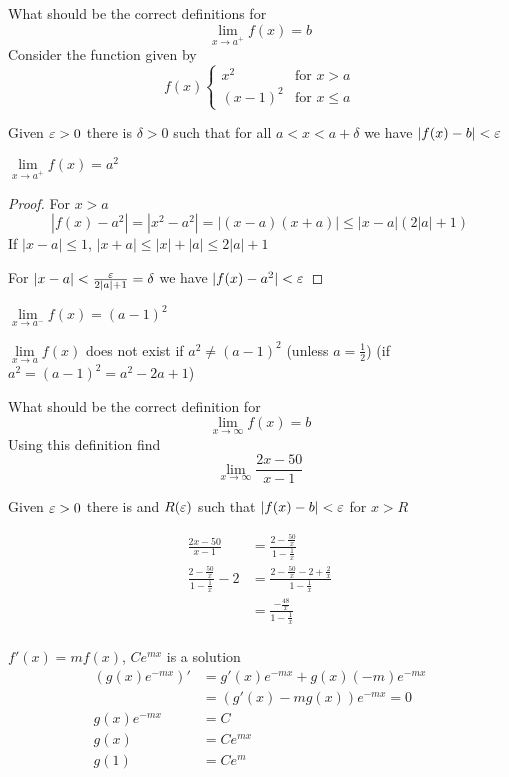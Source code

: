 \begin{question}{6}
  What should be the correct definitions for
  \[\lim\limits_{x \to a^+} f(x) = b\]
  Consider the function given by
  \[f(x)\begin{cases}
    x^2 & \text{for } x > a\\
    (x-1)^2 & \text{for } x \le a
  \end{cases}\]
\end{question}

Given $\varepsilon > 0$ there is $\delta > 0$ such that for all $a < x < a + \delta$ we have $|f(x) - b| < \varepsilon$

$\lim\limits_{x \to a^+} f(x) = a^2$
\begin{proof}
  For $x > a$
  \[|f(x) - a^2| = |x^2 - a^2| = |(x-a)(x+a)| \le |x-a| (2|a| + 1)\]
  If $|x - a| \le 1$, $|x + a| \le |x| + |a| \le 2|a| + 1$

  For $|x-a| < \frac{\varepsilon}{2|a| + 1} = \delta$ we have $|f(x) - a^2| < \varepsilon$
\end{proof}

$\lim\limits_{x \to a^-} f(x) = (a-1)^2$

$\lim\limits_{x \to a} f(x)$ does not exist if $a^2 \neq (a-1)^2$ (unless $a = \frac{1}{2}$)
(if $a^2 = (a-1)^2 = a^2 - 2a + 1$)

\begin{question}{7}
  What should be the correct definition for
  \[\lim\limits_{x \to \infty} f(x) = b\]
  Using this definition find
  \[\lim\limits_{x \to \infty} \frac{2x - 50}{x - 1}\] 
\end{question}

Given $\varepsilon > 0$ there is and $R(\varepsilon)$ such that $|f(x) - b| < \varepsilon$ for $x > R$

\begin{align*}
\frac{2x-50}{x-1} &= \frac{2 - \frac{50}{x}}{1 - \frac{1}{x}}\\
\frac{2 - \frac{50}{x}}{1 - \frac{1}{x}} - 2 &= \frac{2 - \frac{50}{x} -2 + \frac{2}{x}}{1 - \frac{1}{x}}\\
&= \frac{-\frac{48}{x}}{1 - \frac{1}{x}}\\
\end{align*}



\begin{question}{14}
  $f'(x) = mf(x)$, $Ce^{mx}$ is a solution
  \begin{align*}
    (g(x)e^{-mx})' &= g'(x)e^{-mx} + g(x)(-m)e^{-mx} \\
    &= (g'(x)-mg(x))e^{-mx} = 0 \\
    g(x)e^{-mx} &= C \\
    g(x) &= Ce^{mx} \\ 
    g(1) &= Ce^m \\
  \end{align*}
  
\end{question}

